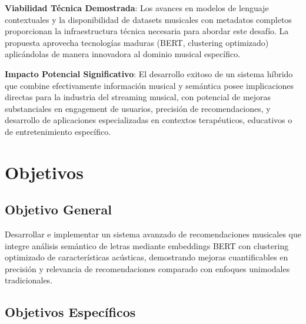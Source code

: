 \documentclass[12pt,a4paper]{article}
\begin{document}
\textbf{Viabilidad Técnica Demostrada}: Los avances en modelos de lenguaje contextuales y la disponibilidad de datasets musicales con metadatos completos proporcionan la infraestructura técnica necesaria para abordar este desafío. La propuesta aprovecha tecnologías maduras (BERT, clustering optimizado) aplicándolas de manera innovadora al dominio musical específico.

\textbf{Impacto Potencial Significativo}: El desarrollo exitoso de un sistema híbrido que combine efectivamente información musical y semántica posee implicaciones directas para la industria del streaming musical, con potencial de mejoras substanciales en engagement de usuarios, precisión de recomendaciones, y desarrollo de aplicaciones especializadas en contextos terapéuticos, educativos o de entretenimiento específico.

\section{Objetivos}

\subsection{Objetivo General}

Desarrollar e implementar un sistema avanzado de recomendaciones musicales que integre análisis semántico de letras mediante embeddings BERT con clustering optimizado de características acústicas, demostrando mejoras cuantificables en precisión y relevancia de recomendaciones comparado con enfoques unimodales tradicionales.

\subsection{Objetivos Específicos}
\end{document}
